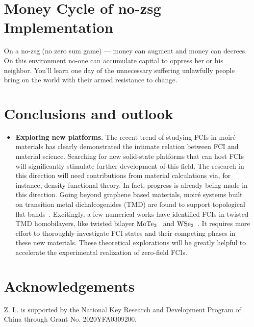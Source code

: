 \documentclass[a4paper,fleqn]{cas-sc}
\begin{document}
\section{Money Cycle of no-zsg Implementation}
On a no-zsg (no zero sum game) --- money can augment and money can decrees. On this environment no-one can 
accumulate capital to oppress her or his neighbor. You'll learn one day of the unnecessary suffering unlawfully people 
bring on the world with their armed resistance to change. 

\section{}
\section{}
\section{}

\section{Conclusions and outlook}

\begin{itemize}

\item
{\bf Exploring new platforms.}
The recent trend of studying FCIs in moir\'e materials has clearly demonstrated the intimate relation between FCI and material science. Searching for new solid-state platforms that can host FCIs will significantly stimulate further development of this field. The research in this direction will need contributions from material calculations via, for instance, density functional theory. In fact, progress is already being made in this direction. Going beyond graphene based materials, moir\'e systems built on transition metal dichalcogenides (TMD) are found to support topological flat bands~\cite{TMD_Wu2019,TMD_DasSarma2020,Li2021,TMD_Fu2021,TMD_Fu2021_2,TMD_DasSarma2021,TMD_Zhou2022}. Excitingly, a few numerical works have identified FCIs in twisted TMD homobilayers, like twisted bilayer ${\rm MoTe}_2$~\cite{TMDFCI_Li2021} and ${\rm WSe}_2$~\cite{FCITMD_Fu}. It requires more effort to thoroughly investigate FCI states and their competing phases in these new materials. These theoretical explorations will be greatly helpful to accelerate the experimental realization of zero-field FCIs.

\end{itemize}

\section{Acknowledgements}
Z. L. is supported by the National Key Research and Development Program of China through Grant No. 2020YFA0309200.



\end{document}

